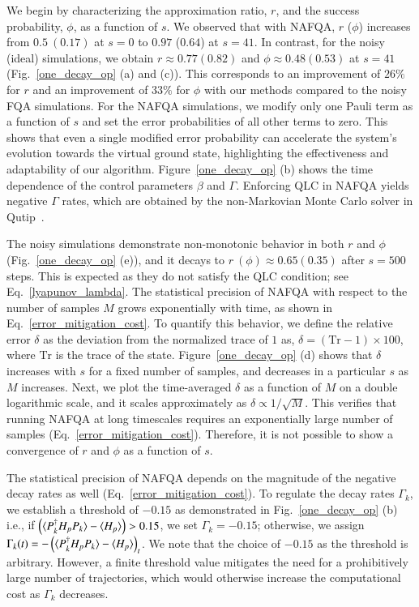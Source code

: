 \documentclass[10pt, superscriptaddress,aps,pra,twocolumn,showpacs,nofootinbib, longbibliography, notitlepage,floatfix]{revtex4-2}
\begin{document}
We begin by characterizing the approximation ratio, $r$, and the success probability, $\phi$, as a function of $s$. We observed that with NAFQA, $r$ ($\phi$) increases from $0.5 ~ (0.17)$ at $s = 0$ to $0.97$ ($0.64$) at $s = 41$. In contrast, for the noisy (ideal) simulations, we obtain $r \approx 0.77 (0.82) $ and $\phi \approx 0.48 (0.53)$ at $s = 41$ (Fig.~\ref{one_decay_op} (a) and (c)). This corresponds to an improvement of $26\%$ for $r$ and an improvement of $33\%$ for $\phi$ with our methods compared to the noisy FQA simulations. For the NAFQA simulations, we modify only one Pauli term as a function of $s$ and set the error probabilities of all other terms to zero. This shows that even a single modified error probability can accelerate the system's evolution towards the virtual ground state, highlighting the effectiveness and adaptability of our algorithm. Figure~\ref{one_decay_op} (b) shows the time dependence of the control parameters $\beta$ and $\Gamma$. Enforcing QLC in NAFQA yields negative $\Gamma$ rates, which are obtained by the non-Markovian Monte Carlo solver in Qutip~\cite{JOHANSSON_qutip_2013}. 

The noisy simulations demonstrate non-monotonic behavior in both $r$ and $\phi$ (Fig.~\ref{one_decay_op} (e)), and it decays to $r ~ (\phi) \approx 0.65 (0.35)$ after $s = 500$ steps. This is expected as they do not satisfy the QLC condition; see Eq.~\eqref{lyapunov_lambda}. {The statistical precision of NAFQA} with respect to the number of samples $M$ grows exponentially with time, as shown in Eq.~\eqref{error_mitigation_cost}. To quantify this behavior, we define the relative error $\delta$ as the deviation from the normalized trace of $1$ as, $\delta = (\text{Tr} -1 ) \times 100$, where $\text{Tr}$ is the trace of the state. Figure~\ref{one_decay_op} (d) shows that $\delta$ increases with $s$ for a fixed number of samples, and decreases in a particular $s$ as $M$ increases. Next, we plot the time-averaged $\delta$ as a function of $M$ on a double logarithmic scale, and it scales approximately as $\delta \propto 1/\sqrt{M}$. This verifies that running NAFQA at long timescales requires an exponentially large number of samples (Eq.~\eqref{error_mitigation_cost}). Therefore, it is not possible to show a convergence of $r$ and $\phi$ as a function of $s$.

The {statistical precision of NAFQA} depends on the magnitude of the negative decay rates as well (Eq.~\eqref{error_mitigation_cost}). To regulate the decay rates $\Gamma_k$, we establish a threshold of $-0.15$ as demonstrated in Fig.~\ref{one_decay_op} (b) i.e., if $\left(\braket{ P_k^\dagger H_p P_k } - \braket{H_p}\right) > 0.15$, we set $\Gamma_k = - 0.15$; otherwise, we assign $\Gamma_k (t)= - \left(\braket{ P_k^\dagger H_p P_k } - \braket{H_p}\right)_t$. We note that the choice of $-0.15$ as the threshold is arbitrary. However, a finite threshold value mitigates the need for a prohibitively large number of trajectories, which would otherwise increase the computational cost as $\Gamma_k$ decreases. 
\end{document}
